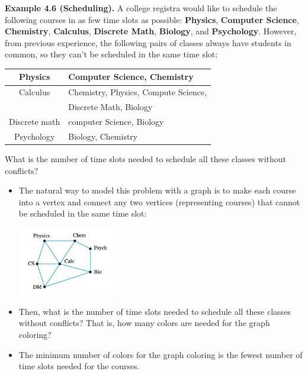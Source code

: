\documentclass[aspectratio=169]{beamer}
\begin{document}
\begin{frame}[plain]{}

  {\bf Example 4.6 (Scheduling).}
   A college registra would like to schedule the following courses in 
    as few time slots as possible: {\bf Physics}, {\bf Computer Science}, 
      {\bf Chemistry}, {\bf Calculus}, {\bf Discrete Math}, {\bf Biology},
      and {\bf Psychology}. However, from previous experience, the following
      pairs of classes always have students in common, so they can't be scheduled
      in the same time slot:
      \medskip
      
      \begin{center}
      \begin{tabular}{|c|l|} \hline
       Physics  & Computer Science, Chemistry \\ \hline
       Calculus & Chemistry, Physics, Compute Science, \\ 
                &  Discrete Math, Biology \\ \hline
       Discrete math & computer Science, Biology \\ \hline
       Psychology & Biology, Chemistry \\ \hline
      \end{tabular}
      \end{center}
      
    What is the  number of time slots needed to schedule all these classes without conflicts? 
 
\end{frame}

\begin{frame}[plain]{}

 \begin{itemize}
  \item The natural way to model this problem with a graph is to make each course into
     a vertex and connect any two vertices (representing courses) that cannot be scheduled 
     in the same time slot: \pause 
      \begin{center}
         \includegraphics[height=3cm]{./img/lecture4-fig7.png}
       \end{center}\pause 
    \item Then,  what is the  number of time slots needed to schedule all these classes without conflicts? 
     That is, how many colors are needed for the graph coloring?
    \item  The minimum number of colors for the graph coloring is the fewest number of time slots needed for the courses. 
 \end{itemize} 
\end{frame}
\end{document}
